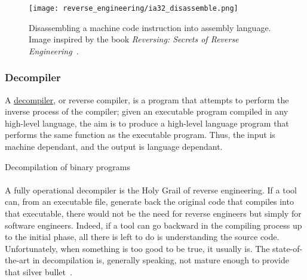 \begin{figure}[!htb]
	\centering
	\texttt{[image: reverse\_engineering/ia32\_disassemble.png]}
	\caption{Disassembling a machine code instruction into assembly language. Image inspired by the book \textit{Reversing: Secrets of Reverse Engineering}~\cite{eilam2005reversing}.}
	\label{fig:ia32_disassemble}
\end{figure}

\subsubsection{Decompiler} \label{sec:decompiler}
\begin{framed}
	\begin{definition} 
		A \underline{decompiler}, or reverse compiler, is a program that attempts to perform the inverse process of the compiler; given an executable program compiled in any high-level language, the aim is to produce a high-level language program that performs the same function as the executable program. Thus, the input is machine dependant, and the output is language dependant.
		\begin{flushright}
			\hfill{}{Decompilation of binary programs~\cite{cifuentes1995decompilation}}
		\end{flushright}
	\end{definition}
\end{framed}

\paragraph{}
A fully operational decompiler is the Holy Grail of reverse engineering. If a tool can, from an executable file, generate back the original code that compiles into that executable, there would not be the need for reverse engineers but simply for software engineers. Indeed, if a tool can go backward in the compiling process up to the initial phase, all there is left to do is understanding the source code. Unfortunately, when something is too good to be true, it usually is. The state-of-the-art in decompilation is, generally speaking, not mature enough to provide that silver bullet~\cite{emmerik2004using}.

